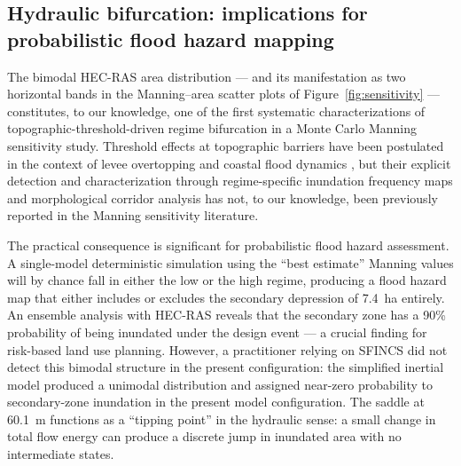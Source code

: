 \documentclass[review,12pt]{elsarticle}
\newcommand{\sfincs}{\textsc{SFINCS}}
\newcommand{\hecras}{\textsc{HEC-RAS}}
\begin{document}
\subsection{Hydraulic bifurcation: implications for probabilistic flood
hazard mapping}
\label{sec:disc_bifurcation}

The bimodal \hecras{} area distribution --- and its manifestation as two
horizontal bands in the Manning--area scatter plots of
Figure~\ref{fig:sensitivity} --- constitutes, to our knowledge, one of the first systematic characterizations
of topographic-threshold-driven regime bifurcation in a Monte Carlo Manning
sensitivity study.
Threshold effects at topographic barriers have been postulated in the context
of levee overtopping \citep{apel2008} and coastal flood dynamics
\citep{vousdoukas2018}, but their explicit detection and characterization
through regime-specific inundation frequency maps and morphological corridor
analysis has not, to our knowledge, been previously reported in the
Manning sensitivity literature.

The practical consequence is significant for probabilistic flood hazard
assessment.
A single-model deterministic simulation using the ``best estimate'' Manning
values will by chance fall in either the low or the high regime, producing a
flood hazard map that either includes or excludes the secondary depression of
7.4~ha entirely.
An ensemble analysis with \hecras{} reveals that the secondary zone has a
90\% probability of being inundated under the design event --- a crucial
finding for risk-based land use planning.
However, a practitioner relying on \sfincs{} did not detect this bimodal
structure in the present configuration: the simplified inertial model
produced a unimodal distribution and assigned near-zero probability to
secondary-zone inundation in the present model configuration.
The saddle at 60.1~m functions as a ``tipping point'' \citep{lenton2011}
in the hydraulic sense: a small change in total flow energy can produce a
discrete jump in inundated area with no intermediate states.
\end{document}
